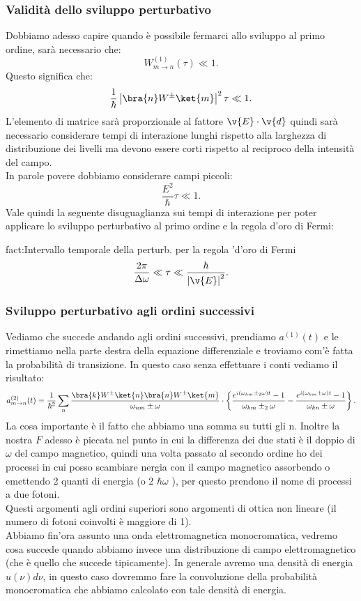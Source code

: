 \subsubsection{Validità dello sviluppo perturbativo}%
Dobbiamo adesso capire quando è possibile fermarci allo sviluppo al primo ordine, sarà necessario che:
\[
    W^{(1) }_{m\to n}(\tau) \ll 1
.\] 
Questo significa che:
\[
\frac{1}{\hbar }\left|\bra{n}W^{\pm} \ket{m}\right|^2\tau \ll 1
.\] 
L'elemento di matrice sarà proporzionale al fattore $\v{E}\cdot \v{d}$ quindi sarà necessario considerare tempi di interazione lunghi rispetto alla larghezza di distribuzione dei livelli ma devono essere corti rispetto al reciproco della intensità del campo.\\
In parole povere dobbiamo considerare campi piccoli:
\[
     \frac{E^2}{\hbar}\tau  \ll 1
.\] 
Vale quindi la seguente disuguaglianza sui tempi di interazione per poter applicare lo sviluppo perturbativo al primo ordine e la regola d'oro di Fermi:
\begin{fact}{fact:Intervallo temporale della perturb. per la regola 'd'oro di Fermi}
\[
    \frac{2\pi}{\Delta\omega}\ll \tau\ll \frac{\hbar }{\left|\v{E}\right|^2}
.\] 
\end{fact}
\subsubsection{Sviluppo perturbativo agli ordini successivi}%
Vediamo che succede andando agli ordini successivi, prendiamo $a^{(1)}(t)$ e le rimettiamo nella parte destra della equazione differenziale e troviamo com'è fatta la probabilità di transizione. In questo caso senza effettuare i conti vediamo il risultato:
\[
    a^{(2)}_{m\to n}(t) =
    \frac{1}{\hbar ^2} \sum_{n}^{} 
    \frac{\bra{k}W^{\pm}\ket{n} \bra{n}W^{\pm} \ket{m}}{\omega_{nm}\pm \omega}
    \cdot 
    \left\{
	\frac{e^{i(\omega_{km}\pm_2\omega)t}-1}{\omega_{km}\pm_2\omega}
    - \frac{e^{i(\omega_{km}\pm \omega)t}-1}{\omega_{kn}\pm\omega}\right\}
.\] 
La cosa importante è il fatto che abbiamo una somma su tutti gli n. Inoltre la nostra $F$ adesso è piccata nel punto in cui la differenza dei due stati è il doppio di $\omega$ del campo magnetico, quindi una volta passato al secondo ordine ho dei processi in cui posso scambiare nergia con il campo magnetico assorbendo o emettendo 2 quanti di energia (o 2 $\hbar \omega$ ), per questo prendono il nome di processi a due fotoni.\\
Questi argomenti agli ordini superiori sono argomenti di ottica non lineare (il numero di fotoni coinvolti è maggiore di 1).\\
Abbiamo fin'ora assunto una onda elettromagnetica monocromatica, vedremo cosa succede quando abbiamo invece una distribuzione di campo elettromagnetico (che è quello che succede tipicamente). In generale avremo una densità di energia $u(\nu)d\nu$, in questo caso dovremmo fare la convoluzione della probabilità monocromatica che abbiamo calcolato con tale densità di energia.
